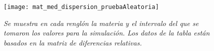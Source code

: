 \begin{figure}[H]
\centering
\texttt{[image: mat\_med\_dispersion\_pruebaAleatoria]} %
\caption[\textit{Matriz con medidas de dispersión de prueba aleatoria}]{\textit{Se muestra en cada renglón la materia y el intervalo del que se tomaron los valores para la simulación. Los datos de la tabla están basados en la matriz de diferencias relativas.}}\label{mat_med_dispersion_pruebaAl}
\end{figure}
